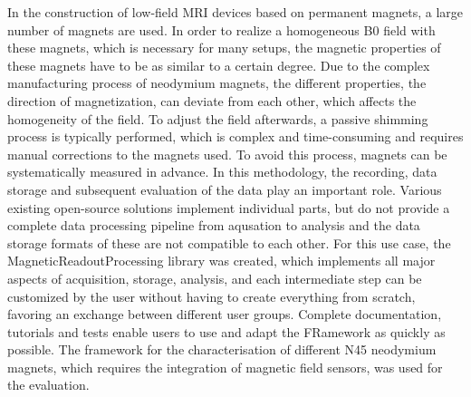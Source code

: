 In the construction of low-field MRI devices based on permanent magnets,
a large number of magnets are used. In order to realize a homogeneous B0
field with these magnets, which is necessary for many setups, the
magnetic properties of these magnets have to be as similar to a certain
degree. Due to the complex manufacturing process of neodymium magnets,
the different properties, the direction of magnetization, can deviate
from each other, which affects the homogeneity of the field. To adjust
the field afterwards, a passive shimming process is typically performed,
which is complex and time-consuming and requires manual corrections to
the magnets used. To avoid this process, magnets can be systematically
measured in advance. In this methodology, the recording, data storage
and subsequent evaluation of the data play an important role. Various
existing open-source solutions implement individual parts, but do not
provide a complete data processing pipeline from aqusation to analysis
and the data storage formats of these are not compatible to each other.
For this use case, the MagneticReadoutProcessing library was created,
which implements all major aspects of acquisition, storage, analysis,
and each intermediate step can be customized by the user without having
to create everything from scratch, favoring an exchange between
different user groups. Complete documentation, tutorials and tests
enable users to use and adapt the FRamework as quickly as possible. The
framework for the characterisation of different N45 neodymium magnets,
which requires the integration of magnetic field sensors, was used for
the evaluation.
